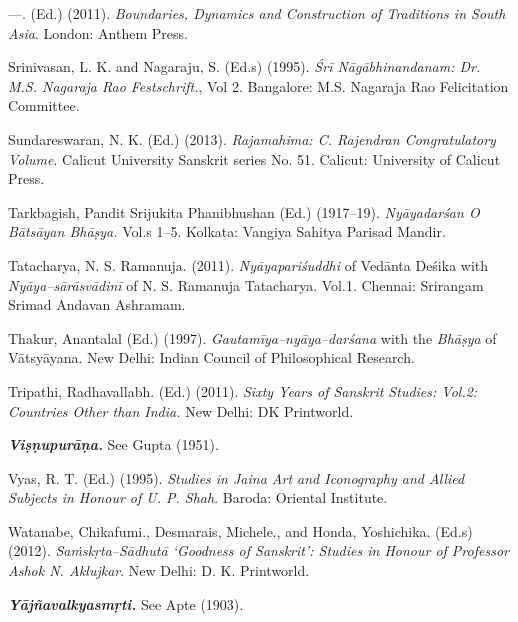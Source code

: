 \begin{thebibliography}{99}
 \item —. (Ed.) (2011). \textit{Boundaries, Dynamics and Construction of Traditions in South Asia}. London: Anthem Press.

 \item Srinivasan, L. K. and Nagaraju, S. (Ed.s) (1995). \textit{Śrī Nāgābhinandanam: Dr. M.S. Nagaraja Rao Festschrift.}, Vol 2. Bangalore: M.S. Nagaraja Rao Felicitation Committee.

 \item Sundareswaran, N. K. (Ed.) (2013).\textit{ Rajamahima: C. Rajendran Congratulatory Volume}. Calicut University Sanskrit series No. 51. Calicut: University of Calicut Press.

 \item Tarkbagish, Pandit Srijukita Phanibhushan (Ed.) (1917–19). \textit{Nyāyadarśan O Bātsāyan Bhāṣya.} Vol.s 1–5. Kolkata: Vangiya Sahitya Parisad Mandir.

 \item Tatacharya, N. S. Ramanuja. (2011). \textit{Nyāyapariśuddhi} of Vedānta Deśika with \textit{Nyāya–sārāsvādinī} of N. S. Ramanuja Tatacharya. Vol.1. Chennai: Srirangam Srimad Andavan Ashramam.

 \item Thakur, Anantalal (Ed.) (1997). \textit{Gautamīya–nyāya–darśana} with the \textit{Bhāṣya} of Vātsyāyana. New Delhi: Indian Council of Philosophical Research.

 \item Tripathi, Radhavallabh. (Ed.) (2011). \textit{Sixty Years of Sanskrit Studies: Vol.2: Countries Other than India. }New Delhi: DK Printworld.

 \item \textit{\textbf{Viṣṇupurāṇa.}} See Gupta (1951).

 \item Vyas, R. T. (Ed.) (1995). \textit{Studies in Jaina Art and Iconography and Allied Subjects in Honour of U. P. Shah}. Baroda: Oriental Institute.

 \item Watanabe, Chikafumi., Desmarais, Michele., and Honda, Yoshichika. (Ed.s) (2012). \textit{Saṁskṛta–Sādhutā ‘Goodness of Sanskrit’: Studies in Honour of Professor Ashok N. Aklujkar}. New Delhi: D. K. Printworld.

 \item \textit{\textbf{Yājñavalkyasmṛti.}} See Apte (1903).

 \end{thebibliography}

\newpage



\theendnotes

